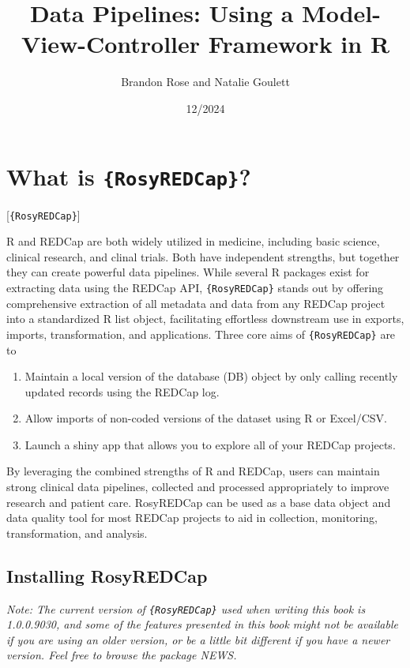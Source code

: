 \documentclass[
]{book}
\title{Data Pipelines: Using a Model-View-Controller Framework in R}
\author{Brandon Rose and Natalie Goulett}
\date{12/2024}
\providecommand{\tightlist}{%
  \setlength{\itemsep}{0pt}\setlength{\parskip}{0pt}}
\begin{document}
\maketitle

{
\setcounter{tocdepth}{1}
\tableofcontents
}
\chapter{\texorpdfstring{What is \texttt{\{RosyREDCap\}}?}{What is \{RosyREDCap\}?}}\label{what-is-rosyredcap}

{[}\texttt{\{RosyREDCap\}}{]}

R and REDCap are both widely utilized in medicine, including basic science, clinical research, and clinal trials.
Both have independent strengths, but together they can create powerful data pipelines.
While several R packages exist for extracting data using the REDCap API, \texttt{\{RosyREDCap\}} stands out by offering comprehensive extraction of all metadata and data from any REDCap project into a standardized R list object, facilitating effortless downstream use in exports, imports, transformation, and applications.
Three core aims of \texttt{\{RosyREDCap\}} are to

\begin{enumerate}
\def\labelenumi{\arabic{enumi}.}
\tightlist
\item
  Maintain a local version of the database (DB) object by only calling recently updated records using the REDCap log.
\item
  Allow imports of non-coded versions of the dataset using R or Excel/CSV.
\item
  Launch a shiny app that allows you to explore all of your REDCap projects.
\end{enumerate}

By leveraging the combined strengths of R and REDCap, users can maintain strong clinical data pipelines, collected and processed appropriately to improve research and patient care.
RosyREDCap can be used as a base data object and data quality tool for most REDCap projects to aid in collection, monitoring, transformation, and analysis.

\section{Installing RosyREDCap}\label{installing-rosyredcap}

\emph{Note: The current version of \texttt{\{RosyREDCap\}} used when writing this book is 1.0.0.9030, and some of the features presented in this book might not be available if you are using an older version, or be a little bit different if you have a newer version. Feel free to browse the package NEWS.}
\end{document}
